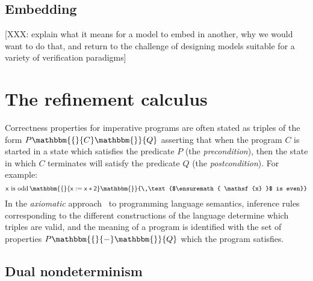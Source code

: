 \documentclass[draft,11pt]{report}
\newcommand{\kw}[1]{\ensuremath{ \mathsf{#1} }}
\newcommand{\htr}[3]{{ {#1} \mathbbm{\{} {#2} \mathbbm{\}} {#3} }}
\begin{document}

\subsection{Embedding} %

[XXX: explain what it means for a model to embed in another,
why we would want to do that,
and return to the challenge of designing models
suitable for a variety of verification paradigms]



\section{The refinement calculus} %


Correctness properties for imperative programs
are often stated as triples of the form $\htr{P}{C}{Q}$
asserting that
when the program $C$ is started in a state which
satisfies the predicate $P$ (the \emph{precondition}),
then the state in which $C$ terminates
will satisfy the predicate $Q$ (the \emph{postcondition}).
For example:
\[
    \htr{\text{$\kw{x}$ is odd}\,}{\kw{x := x * 2}}{\,\text{$\kw{x}$ is even}}
\]
In the \emph{axiomatic} approach~\citep{hoare69} to programming language semantics,
inference rules
corresponding to the different constructions of the language
determine which triples are valid,
and the meaning of a program is identified with
the set of properties $\htr{P}{-}{Q}$
which the program satisfies.

\subsection{Dual nondeterminism}
\end{document}

